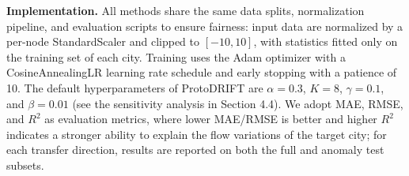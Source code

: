 \noindent \textbf{Implementation.} All methods share the same data splits, normalization pipeline, and evaluation scripts to ensure fairness: input data are normalized by a per-node StandardScaler and clipped to $[-10, 10]$, with statistics fitted only on the training set of each city. Training uses the Adam optimizer with a CosineAnnealingLR learning rate schedule and early stopping with a patience of 10. The default hyperparameters of ProtoDRIFT are $\alpha=0.3$, $K=8$, $\gamma=0.1$, and $\beta=0.01$ (see the sensitivity analysis in Section 4.4). We adopt MAE, RMSE, and $R^2$ as evaluation metrics, where lower MAE/RMSE is better and higher $R^2$ indicates a stronger ability to explain the flow variations of the target city; for each transfer direction, results are reported on both the full and anomaly test subsets.


